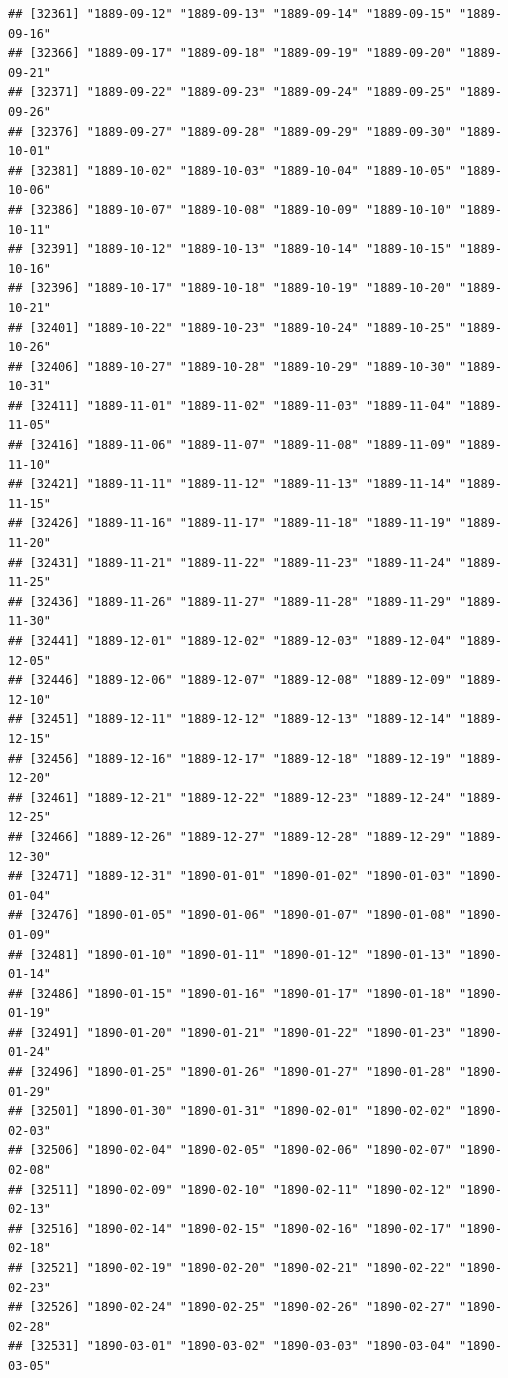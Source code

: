 \documentclass{article}\usepackage[]{graphicx}\usepackage[]{color}
\makeatletter
\newenvironment{kframe}{%
 \def\at@end@of@kframe{}%
 \ifinner\ifhmode%
  \def\at@end@of@kframe{\end{minipage}}%
  \begin{minipage}{\columnwidth}%
 \fi\fi%
 \def\FrameCommand##1{\hskip\@totalleftmargin \hskip-\fboxsep
 \colorbox{shadecolor}{##1}\hskip-\fboxsep
     \hskip-\linewidth \hskip-\@totalleftmargin \hskip\columnwidth}%
 \MakeFramed {\advance\hsize-\width
   \@totalleftmargin\z@ \linewidth\hsize
   \@setminipage}}%
 {\par\unskip\endMakeFramed%
 \at@end@of@kframe}
\newenvironment{knitrout}{}{} %
\makeatother
\begin{document}
\begin{description}
\begin{knitrout}
\begin{kframe}
\begin{verbatim}
## [32361] "1889-09-12" "1889-09-13" "1889-09-14" "1889-09-15" "1889-09-16"
## [32366] "1889-09-17" "1889-09-18" "1889-09-19" "1889-09-20" "1889-09-21"
## [32371] "1889-09-22" "1889-09-23" "1889-09-24" "1889-09-25" "1889-09-26"
## [32376] "1889-09-27" "1889-09-28" "1889-09-29" "1889-09-30" "1889-10-01"
## [32381] "1889-10-02" "1889-10-03" "1889-10-04" "1889-10-05" "1889-10-06"
## [32386] "1889-10-07" "1889-10-08" "1889-10-09" "1889-10-10" "1889-10-11"
## [32391] "1889-10-12" "1889-10-13" "1889-10-14" "1889-10-15" "1889-10-16"
## [32396] "1889-10-17" "1889-10-18" "1889-10-19" "1889-10-20" "1889-10-21"
## [32401] "1889-10-22" "1889-10-23" "1889-10-24" "1889-10-25" "1889-10-26"
## [32406] "1889-10-27" "1889-10-28" "1889-10-29" "1889-10-30" "1889-10-31"
## [32411] "1889-11-01" "1889-11-02" "1889-11-03" "1889-11-04" "1889-11-05"
## [32416] "1889-11-06" "1889-11-07" "1889-11-08" "1889-11-09" "1889-11-10"
## [32421] "1889-11-11" "1889-11-12" "1889-11-13" "1889-11-14" "1889-11-15"
## [32426] "1889-11-16" "1889-11-17" "1889-11-18" "1889-11-19" "1889-11-20"
## [32431] "1889-11-21" "1889-11-22" "1889-11-23" "1889-11-24" "1889-11-25"
## [32436] "1889-11-26" "1889-11-27" "1889-11-28" "1889-11-29" "1889-11-30"
## [32441] "1889-12-01" "1889-12-02" "1889-12-03" "1889-12-04" "1889-12-05"
## [32446] "1889-12-06" "1889-12-07" "1889-12-08" "1889-12-09" "1889-12-10"
## [32451] "1889-12-11" "1889-12-12" "1889-12-13" "1889-12-14" "1889-12-15"
## [32456] "1889-12-16" "1889-12-17" "1889-12-18" "1889-12-19" "1889-12-20"
## [32461] "1889-12-21" "1889-12-22" "1889-12-23" "1889-12-24" "1889-12-25"
## [32466] "1889-12-26" "1889-12-27" "1889-12-28" "1889-12-29" "1889-12-30"
## [32471] "1889-12-31" "1890-01-01" "1890-01-02" "1890-01-03" "1890-01-04"
## [32476] "1890-01-05" "1890-01-06" "1890-01-07" "1890-01-08" "1890-01-09"
## [32481] "1890-01-10" "1890-01-11" "1890-01-12" "1890-01-13" "1890-01-14"
## [32486] "1890-01-15" "1890-01-16" "1890-01-17" "1890-01-18" "1890-01-19"
## [32491] "1890-01-20" "1890-01-21" "1890-01-22" "1890-01-23" "1890-01-24"
## [32496] "1890-01-25" "1890-01-26" "1890-01-27" "1890-01-28" "1890-01-29"
## [32501] "1890-01-30" "1890-01-31" "1890-02-01" "1890-02-02" "1890-02-03"
## [32506] "1890-02-04" "1890-02-05" "1890-02-06" "1890-02-07" "1890-02-08"
## [32511] "1890-02-09" "1890-02-10" "1890-02-11" "1890-02-12" "1890-02-13"
## [32516] "1890-02-14" "1890-02-15" "1890-02-16" "1890-02-17" "1890-02-18"
## [32521] "1890-02-19" "1890-02-20" "1890-02-21" "1890-02-22" "1890-02-23"
## [32526] "1890-02-24" "1890-02-25" "1890-02-26" "1890-02-27" "1890-02-28"
## [32531] "1890-03-01" "1890-03-02" "1890-03-03" "1890-03-04" "1890-03-05"

\end{verbatim}
\end{kframe}
\end{knitrout}
\end{description}
\end{document}
